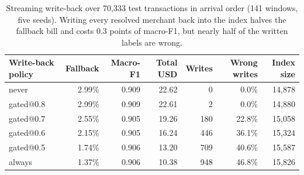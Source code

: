 \begin{table}[t]
\centering
\caption{Streaming write-back over 70,333 test transactions in arrival order (141 windows, five seeds). Writing every resolved merchant back into the index halves the fallback bill and costs 0.3 points of macro-F1, but nearly half of the written labels are wrong.}
\label{tab:writeback}
\begin{tabular}{lrrrrrr}
\toprule
Write-back policy & Fallback & Macro-F1 & Total USD & Writes & Wrong writes & Index size\\
\midrule
never & 2.99\% & 0.909 & 22.62 & 0 & 0.0\% & 14,878 \\
gated@0.8 & 2.99\% & 0.909 & 22.61 & 2 & 0.0\% & 14,880 \\
gated@0.7 & 2.55\% & 0.905 & 19.26 & 180 & 22.8\% & 15,058 \\
gated@0.6 & 2.15\% & 0.905 & 16.24 & 446 & 36.1\% & 15,324 \\
gated@0.5 & 1.74\% & 0.906 & 13.20 & 709 & 40.6\% & 15,587 \\
always & 1.37\% & 0.906 & 10.38 & 948 & 46.8\% & 15,826 \\
\bottomrule
\end{tabular}
\end{table}
